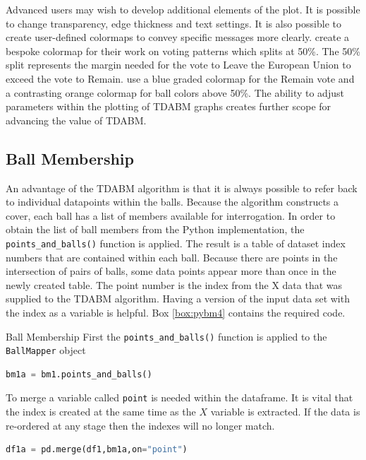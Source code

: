 \documentclass{article}
\begin{document}
Advanced users may wish to develop additional elements of the plot. It is possible to change transparency, edge thickness and text settings. It is also possible to create user-defined colormaps to convey specific messages more clearly. \cite{rudkin2023economic} create a bespoke colormap for their work on voting patterns which splits at 50\%. The 50\% split represents the margin needed for the vote to Leave the European Union to exceed the vote to Remain. \cite{rudkin2023economic} use a blue graded colormap for the Remain vote and a contrasting orange colormap for ball colors above 50\%. The ability to adjust parameters within the plotting of TDABM graphs creates further scope for advancing the value of TDABM. 

\subsection{Ball Membership}

An advantage of the TDABM algorithm is that it is always possible to refer back to individual datapoints within the balls. Because the algorithm constructs a cover, each ball has a list of members available for interrogation. In order to obtain the list of ball members from the Python implementation, the \texttt{points\_and\_balls()} function is applied. The result is a table of dataset index numbers that are contained within each ball. Because there are points in the intersection of pairs of balls, some data points appear more than once in the newly created table. The point number is the index from the X data that was supplied to the TDABM algorithm. Having a version of the input data set with the index as a variable is helpful. Box \ref{box:pybm4} contains the required code.

\begin{mybox}[label=box:pybm4]{Ball Membership}
	First the \texttt{points\_and\_balls()} function is applied to the \texttt{BallMapper} object
	\begin{lstlisting}[language=Python]
		bm1a = bm1.points_and_balls()
	\end{lstlisting}
	To merge a variable called \texttt{point} is needed within the dataframe. It is vital that the index is created at the same time as the $X$ variable is extracted. If the data is re-ordered at any stage then the indexes will no longer match.
	\begin{lstlisting}[language=Python]
		df1a = pd.merge(df1,bm1a,on="point")
	\end{lstlisting}
\end{mybox}
\end{document}
